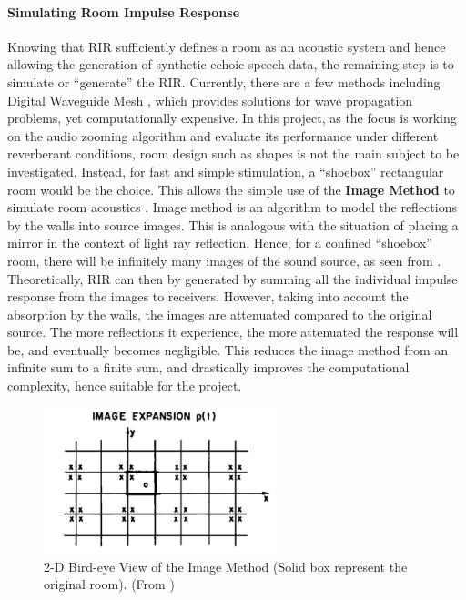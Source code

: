 \documentclass[a4paper,twoside,12pt,hidelinks]{article}
\begin{document}
\paragraph{Simulating Room Impulse Response}
Knowing that RIR sufficiently defines a room as an acoustic system and hence allowing the generation of synthetic echoic speech data, the remaining step is to simulate or ``generate'' the RIR. Currently, there are a few methods including Digital Waveguide Mesh \cite{Murphy2008HybridSimulation}, which provides solutions for wave propagation problems, yet computationally expensive. In this project, as the focus is working on the audio zooming algorithm and evaluate its performance under different reverberant conditions, room design such as shapes is not the main subject to be investigated. Instead, for fast and simple stimulation, a ``shoebox'' rectangular room would be the choice. This allows the simple use of the \textbf{Image Method} to simulate room acoustics \cite{Allen1979ImageMethod}. Image method is an algorithm to model the reflections by the walls into source images. This is analogous with the situation of placing a mirror in the context of light ray reflection. Hence, for a confined ``shoebox'' room, there will be infinitely many images of the sound source, as seen from . Theoretically, RIR can then by generated by summing all the individual impulse response from the images to receivers. However, taking into account the absorption by the walls, the images are attenuated compared to the original source. The more reflections it experience, the more attenuated the response will be, and eventually becomes negligible. This reduces the image method from an infinite sum to a finite sum, and drastically improves the computational complexity, hence suitable for the project.

\begin{figure}[H]
\begin{center}
\includegraphics[width=0.6\textwidth]{imagemethod}
\end{center}
\caption{2-D Bird-eye View of the Image Method (Solid box represent the original room). (From \cite{Allen1979ImageMethod})}
\label{fig:imagemethod}
\end{figure}
\end{document}

